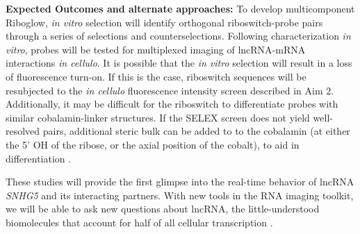 


\textbf{Expected Outcomes and alternate approaches:}
To develop multicomponent Riboglow, \textit{in vitro} selection will identify orthogonal riboswitch-probe pairs through a series of selections and counterselections.
Following characterization \textit{in vitro}, probes will be tested for multiplexed imaging of lncRNA-mRNA interactions \textit{in cellulo}. It is possible that the \textit{in vitro} selection will result in a loss of fluorescence turn-on. If this is the case, riboswitch sequences will be resubjected to the \textit{in cellulo} fluorescence intensity screen described in Aim 2.
Additionally, it may be difficult for the riboswitch to differentiate probes with similar cobalamin-linker structures. If the SELEX screen does not yield well-resolved pairs, additional steric bulk can be added to to the cobalamin (at either the 5' OH of the ribose, or the axial position of the cobalt), to aid in differentiation \cite{ChrominskiVitaminB12Derivatives2014}.

These studies will provide the first glimpse into the real-time behavior of lncRNA \textit{SNHG5} and its interacting partners. With new tools in the RNA imaging toolkit, we will be able to ask new questions about lncRNA, the little-understood biomolecules that account for half of all cellular transcription \cite{Rinntranscriptionalactivityhuman2003,RinnGenomeRegulationLong2012}.

